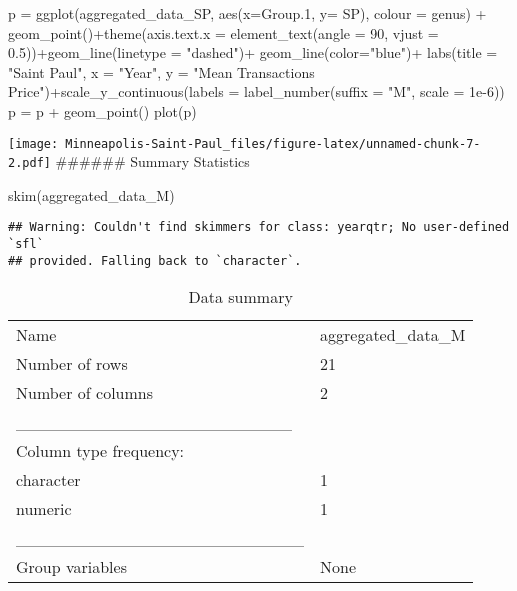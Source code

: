 \documentclass[
]{article}
\newenvironment{Shaded}{\begin{snugshade}}{\end{snugshade}}
\newcommand{\AttributeTok}[1]{\textcolor[rgb]{0.77,0.63,0.00}{#1}}
\newcommand{\DecValTok}[1]{\textcolor[rgb]{0.00,0.00,0.81}{#1}}
\newcommand{\FloatTok}[1]{\textcolor[rgb]{0.00,0.00,0.81}{#1}}
\newcommand{\FunctionTok}[1]{\textcolor[rgb]{0.00,0.00,0.00}{#1}}
\newcommand{\NormalTok}[1]{#1}
\newcommand{\OtherTok}[1]{\textcolor[rgb]{0.56,0.35,0.01}{#1}}
\newcommand{\SpecialCharTok}[1]{\textcolor[rgb]{0.00,0.00,0.00}{#1}}
\newcommand{\StringTok}[1]{\textcolor[rgb]{0.31,0.60,0.02}{#1}}
\begin{document}
\begin{Shaded}
\begin{Highlighting}[]
\NormalTok{p }\OtherTok{=} \FunctionTok{ggplot}\NormalTok{(aggregated\_data\_SP, }\FunctionTok{aes}\NormalTok{(}\AttributeTok{x=}\NormalTok{Group}\FloatTok{.1}\NormalTok{, }\AttributeTok{y=}\NormalTok{ SP), }\AttributeTok{colour =}\NormalTok{ genus) }\SpecialCharTok{+} 
  \FunctionTok{geom\_point}\NormalTok{()}\SpecialCharTok{+}\FunctionTok{theme}\NormalTok{(}\AttributeTok{axis.text.x =} \FunctionTok{element\_text}\NormalTok{(}\AttributeTok{angle =} \DecValTok{90}\NormalTok{, }\AttributeTok{vjust =} \FloatTok{0.5}\NormalTok{))}\SpecialCharTok{+}\FunctionTok{geom\_line}\NormalTok{(}\AttributeTok{linetype =} \StringTok{"dashed"}\NormalTok{)}\SpecialCharTok{+} \FunctionTok{geom\_line}\NormalTok{(}\AttributeTok{color=}\StringTok{"blue"}\NormalTok{)}\SpecialCharTok{+} \FunctionTok{labs}\NormalTok{(}\AttributeTok{title =} \StringTok{"Saint Paul"}\NormalTok{, }\AttributeTok{x =} \StringTok{"Year"}\NormalTok{, }\AttributeTok{y =} \StringTok{"Mean Transactions Price"}\NormalTok{)}\SpecialCharTok{+}\FunctionTok{scale\_y\_continuous}\NormalTok{(}\AttributeTok{labels =} \FunctionTok{label\_number}\NormalTok{(}\AttributeTok{suffix =} \StringTok{"M"}\NormalTok{, }\AttributeTok{scale =} \FloatTok{1e{-}6}\NormalTok{))}
\NormalTok{p }\OtherTok{=}\NormalTok{ p }\SpecialCharTok{+} \FunctionTok{geom\_point}\NormalTok{()}
\FunctionTok{plot}\NormalTok{(p)}
\end{Highlighting}
\end{Shaded}

\texttt{[image: Minneapolis-Saint-Paul\_files/figure-latex/unnamed-chunk-7-2.pdf]}
\#\#\#\#\#\# Summary Statistics

\begin{Shaded}
\begin{Highlighting}[]
\FunctionTok{skim}\NormalTok{(aggregated\_data\_M)}
\end{Highlighting}
\end{Shaded}

\begin{verbatim}
## Warning: Couldn't find skimmers for class: yearqtr; No user-defined `sfl`
## provided. Falling back to `character`.
\end{verbatim}

\begin{longtable}[]{@{}ll@{}}
\caption{Data summary}\tabularnewline
\toprule()
\endhead
Name & aggregated\_data\_M \\
Number of rows & 21 \\
Number of columns & 2 \\
\_\_\_\_\_\_\_\_\_\_\_\_\_\_\_\_\_\_\_\_\_\_\_ & \\
Column type frequency: & \\
character & 1 \\
numeric & 1 \\
\_\_\_\_\_\_\_\_\_\_\_\_\_\_\_\_\_\_\_\_\_\_\_\_ & \\
Group variables & None \\
\bottomrule()
\end{longtable}
\end{document}
